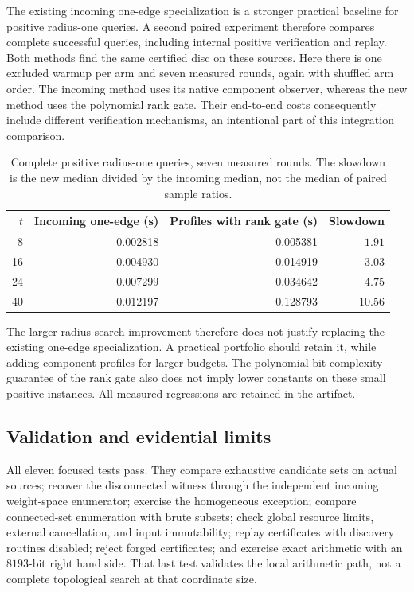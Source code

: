 The existing incoming one-edge specialization is a stronger practical
baseline for positive radius-one queries.  A second paired experiment
therefore compares complete successful queries, including internal
positive verification and replay.  Both methods find the same certified
disc on these sources.  Here there is one excluded warmup per arm and
seven measured rounds, again with shuffled arm order.  The incoming
method uses its native component observer, whereas the new method uses
the polynomial rank gate.  Their end-to-end costs consequently include
different verification mechanisms, an intentional part of this
integration comparison.

\begin{table}[htbp]
\centering
\small
\begin{tabular}{rrrr}
\hline
$t$ & Incoming one-edge (s) & Profiles with rank gate (s) & Slowdown\\
\hline
8 & 0.002818 & 0.005381 & $1.91$\\
16 & 0.004930 & 0.014919 & $3.03$\\
24 & 0.007299 & 0.034642 & $4.75$\\
40 & 0.012197 & 0.128793 & $10.56$\\
\hline
\end{tabular}
\caption{Complete positive radius-one queries, seven measured rounds.
The slowdown is the new median divided by the incoming median, not the
median of paired sample ratios.}
\label{tab:profile-radius-one}
\end{table}

The larger-radius search improvement therefore does not justify
replacing the existing one-edge specialization.  A practical portfolio
should retain it, while adding component profiles for larger budgets.
The polynomial bit-complexity guarantee of the rank gate also does not
imply lower constants on these small positive instances.  All measured
regressions are retained in the artifact.

\subsection{Validation and evidential limits}

All eleven focused tests pass.  They compare exhaustive candidate sets
on actual sources; recover the disconnected witness through the
independent incoming weight-space enumerator; exercise the homogeneous
exception; compare connected-set enumeration with brute subsets; check
global resource limits, external cancellation, and input immutability;
replay certificates with discovery routines disabled; reject forged
certificates; and exercise exact arithmetic with an $8193$-bit right
hand side.  That last test validates the local arithmetic path, not a
complete topological search at that coordinate size.

